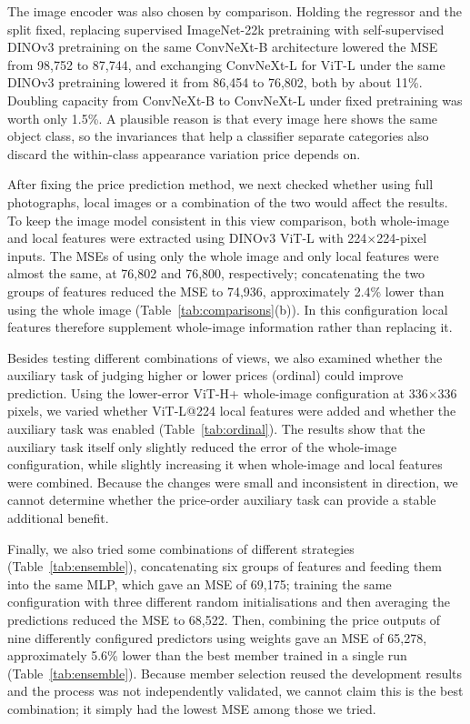 The image encoder was also chosen by comparison. Holding the regressor and the split fixed, replacing supervised ImageNet-22k pretraining with self-supervised DINOv3 pretraining on the same ConvNeXt-B architecture lowered the MSE from 98,752 to 87,744, and exchanging ConvNeXt-L for ViT-L under the same DINOv3 pretraining lowered it from 86,454 to 76,802, both by about 11\%. Doubling capacity from ConvNeXt-B to ConvNeXt-L under fixed pretraining was worth only 1.5\%. A plausible reason is that every image here shows the same object class, so the invariances that help a classifier separate categories also discard the within-class appearance variation price depends on.


After fixing the price prediction method, we next checked whether using full photographs, local images or a combination of the two would affect the results. To keep the image model consistent in this view comparison, both whole-image and local features were extracted using DINOv3 ViT-L with 224\ensuremath{\times}224-pixel inputs. The MSEs of using only the whole image and only local features were almost the same, at 76,802 and 76,800, respectively; concatenating the two groups of features reduced the MSE to 74,936, approximately 2.4\% lower than using the whole image (Table~\ref{tab:comparisons}(b)). In this configuration local features therefore supplement whole-image information rather than replacing it.

Besides testing different combinations of views, we also examined whether the auxiliary task of judging higher or lower prices (ordinal) could improve prediction. Using the lower-error ViT-H+ whole-image configuration at 336\ensuremath{\times}336 pixels, we varied whether ViT-L@224 local features were added and whether the auxiliary task was enabled (Table~\ref{tab:ordinal}). The results show that the auxiliary task itself only slightly reduced the error of the whole-image configuration, while slightly increasing it when whole-image and local features were combined. Because the changes were small and inconsistent in direction, we cannot determine whether the price-order auxiliary task can provide a stable additional benefit.


Finally, we also tried some combinations of different strategies (Table~\ref{tab:ensemble}), concatenating six groups of features and feeding them into the same MLP, which gave an MSE of 69,175; training the same configuration with three different random initialisations and then averaging the predictions reduced the MSE to 68,522. Then, combining the price outputs of nine differently configured predictors using weights gave an MSE of 65,278, approximately 5.6\% lower than the best member trained in a single run (Table~\ref{tab:ensemble}). Because member selection reused the development results and the process was not independently validated, we cannot claim this is the best combination; it simply had the lowest MSE among those we tried.


